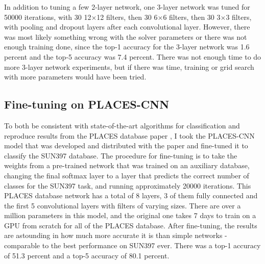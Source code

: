 \documentclass[10pt]{article}
\begin{document}
\begin{table}[!ht]
\centering
{}
\caption{Summary of top-1 and top-5 accuracy results on two-layer networks after 20000 iterations}
\label{tbl:twolayer}
\end{table}

In addition to tuning a few 2-layer network, one 3-layer network was tuned for 50000 iterations, with 30 12$\times$12 filters, then 30 6$\times$6 filters, then 30 3$\times$3 filters, with pooling and dropout layers after each convolutional layer. However, there was most likely something wrong with the solver parameters or there was not enough training done, since the top-1 accuracy for the 3-layer network was 1.6 percent and the top-5 accuracy was 7.4 percent. There was not enough time to do more 3-layer network experiments, but if there was time, training or grid search with more parameters would have been tried.

\subsection{Fine-tuning on PLACES-CNN}

To both be consistent with state-of-the-art algorithms for classification and reproduce results from the PLACES database paper \cite{zhou_learning_2014}, I took the PLACES-CNN model that was developed and distributed with the paper and fine-tuned it to classify the SUN397 database. The procedure for fine-tuning is to take the weights from a pre-trained network that was trained on an auxiliary database, changing the final softmax layer to a layer that predicts the correct number of classes for the SUN397 task, and running approximately 20000 iterations. This PLACES database network has a total of 8 layers, 3 of them fully connected and the first 5 convolutional layers with filters of varying sizes. There are over a million parameters in this model, and the original one takes 7 days to train on a GPU from scratch for all of the PLACES database. After fine-tuning, the results are astounding in how much more accurate it is than simple networks - comparable to the best performance on SUN397 ever. There was a top-1 accuracy of 51.3 percent and a top-5 accuracy of 80.1 percent.
\end{document}
